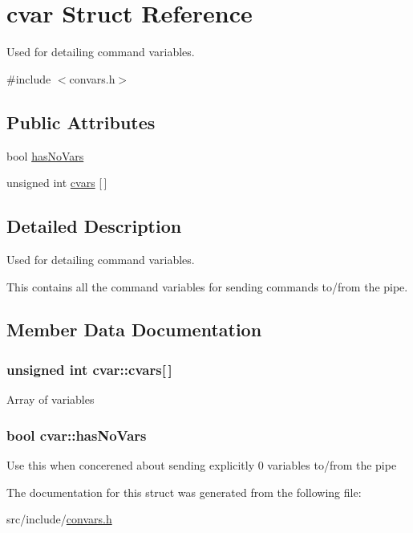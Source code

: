\hypertarget{structcvar}{}\section{cvar Struct Reference}
\label{structcvar}


Used for detailing command variables.  




{\ttfamily \#include $<$convars.\+h$>$}

\subsection*{Public Attributes}
\begin{DoxyCompactItemize}
\item 
bool \hyperlink{structcvar_aa794fa0e83c38ce012cb7b86d4810de1}{has\+No\+Vars}
\item 
unsigned int \hyperlink{structcvar_a6b96a66add0508c54c72b8b4e02ee3e7}{cvars} \mbox{[}$\,$\mbox{]}
\end{DoxyCompactItemize}


\subsection{Detailed Description}
Used for detailing command variables. 

This contains all the command variables for sending commands to/from the pipe. 

\subsection{Member Data Documentation}
\hypertarget{structcvar_a6b96a66add0508c54c72b8b4e02ee3e7}{}
\subsubsection[{cvars}]{\setlength{\rightskip}{0pt plus 5cm}unsigned int cvar\+::cvars\mbox{[}$\,$\mbox{]}}\label{structcvar_a6b96a66add0508c54c72b8b4e02ee3e7}
Array of variables \hypertarget{structcvar_aa794fa0e83c38ce012cb7b86d4810de1}{}
\subsubsection[{has\+No\+Vars}]{\setlength{\rightskip}{0pt plus 5cm}bool cvar\+::has\+No\+Vars}\label{structcvar_aa794fa0e83c38ce012cb7b86d4810de1}
Use this when concerened about sending explicitly 0 variables to/from the pipe 

The documentation for this struct was generated from the following file\+:\begin{DoxyCompactItemize}
\item 
src/include/\hyperlink{convars_8h}{convars.\+h}\end{DoxyCompactItemize}
